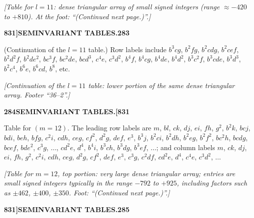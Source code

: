 \documentclass[11pt]{article}
\begin{document}
\medskip

\noindent\textit{[Table for $l=11$: dense triangular array of small signed integers (range $\approx -420$ to $+810$). At the foot: ``(Continued next page.)''.]}

\bigskip

\newpage

\noindent\textbf{831]}\hfill\textbf{SEMINVARIANT TABLES.}\hfill\textbf{283}

\bigskip

\noindent (Continuation of the $l=11$ table.) Row labels include $b^{3}cg$, $b^{2}fg$, $b^{2}cdg$, $b^{2}cef$, $b^{2}d^{2}f$, $b^{2}de^{2}$, $bc^{3}f$, $bc^{2}de$, $bcd^{3}$, $c^{4}e$, $c^{3}d^{2}$, $b^{4}f$, $b^{4}cg$, $b^{4}de$, $b^{4}d^{2}$, $b^{3}c^{2}f$, $b^{3}cde$, $b^{3}d^{3}$, $b^{2}c^{4}$, $b^{6}e$, $b^{6}cd$, $b^{8}$, etc.

\medskip

\noindent\textit{[Continuation of the $l=11$ table: lower portion of the same dense triangular array. Footer ``36--2''.]}

\bigskip

\newpage

\noindent\textbf{284}\hfill\textbf{SEMINVARIANT TABLES.}\hfill\textbf{[831}

\bigskip

\noindent Table for $(m = 12)$. The leading row labels are
$m$, $bl$, $ck$, $dj$, $ei$, $fh$, $g^{2}$, $b^{2}k$, $bcj$, $bdi$, $beh$, $bfg$, $c^{2}i$, $cdh$, $ceg$, $cf^{2}$, $d^{2}g$, $def$, $e^{3}$, $b^{3}j$, $b^{2}ci$, $b^{2}dh$, $b^{2}eg$, $b^{2}f^{2}$, $bc^{2}h$, $bcdg$, $bcef$, $bde^{2}$, $c^{3}g$, $\ldots$, $cd^{2}e$, $d^{4}$, $b^{4}i$, $b^{3}ch$, $b^{3}dg$, $b^{3}ef$, $\ldots$;
and column labels
$m$, $ck$, $dj$, $ei$, $fh$, $g^{2}$, $c^{2}i$, $cdh$, $ceg$, $d^{2}g$, $cf^{2}$, $def$, $e^{3}$, $c^{3}g$, $c^{2}df$, $cd^{2}e$, $d^{4}$, $c^{4}e$, $c^{3}d^{2}$, $\ldots$

\medskip

\noindent\textit{[Table for $m=12$, top portion: very large dense triangular array; entries are small signed integers typically in the range $-792$ to $+925$, including factors such as $\pm 462$, $\pm 400$, $\pm 350$. Foot: ``(Continued next page.)''.]}

\bigskip

\newpage

\noindent\textbf{831]}\hfill\textbf{SEMINVARIANT TABLES.}\hfill\textbf{285}

\bigskip
\end{document}
